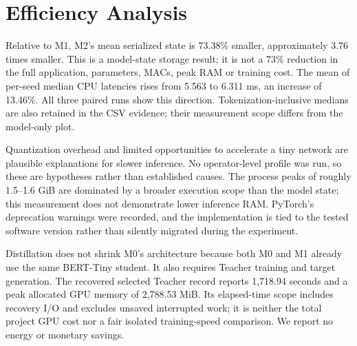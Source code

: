 \documentclass[11pt]{article}
\begin{document}
\section{Efficiency Analysis}
Relative to M1, M2's mean serialized state is 73.38\% smaller, approximately 3.76 times smaller. This is a model-state storage result; it is not a 73\% reduction in the full application, parameters, MACs, peak RAM or training cost. The mean of per-seed median CPU latencies rises from 5.563 to 6.311 ms, an increase of 13.46\%. All three paired runs show this direction. Tokenization-inclusive medians are also retained in the CSV evidence; their measurement scope differs from the model-only plot.

Quantization overhead and limited opportunities to accelerate a tiny network are plausible explanations for slower inference. No operator-level profile was run, so these are hypotheses rather than established causes. The process peaks of roughly 1.5--1.6 GiB are dominated by a broader execution scope than the model state; this measurement does not demonstrate lower inference RAM. PyTorch's deprecation warnings were recorded, and the implementation is tied to the tested software version rather than silently migrated during the experiment.

Distillation does not shrink M0's architecture because both M0 and M1 already use the same BERT-Tiny student. It also requires Teacher training and target generation. The recovered selected Teacher record reports 1,718.94 seconds and a peak allocated GPU memory of 2,788.53 MiB. Its elapsed-time scope includes recovery I/O and excludes unsaved interrupted work; it is neither the total project GPU cost nor a fair isolated training-speed comparison. We report no energy or monetary savings.
\end{document}
